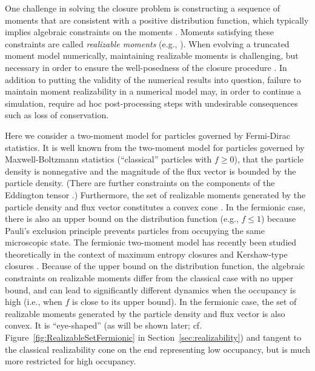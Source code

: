 One challenge in solving the closure problem is constructing a sequence of moments that are consistent with a positive distribution function, which typically implies algebraic constraints on the moments \cite{kershaw_1976,levermore_1984}.  
Moments satisfying these constraints are called \emph{realizable moments} (e.g., \cite{levermore_1996}).  
When evolving a truncated moment model numerically, maintaining realizable moments is challenging, but necessary in order to ensure the well-posedness of the closure procedure \cite{levermore_1996,junk_1998,hauck_2008}.  
In addition to putting the validity of the numerical results into question, failure to maintain moment realizability in a numerical model may, in order to continue a simulation, require ad hoc post-processing steps with undesirable consequences such as loss of conservation.  

Here we consider a two-moment model for particles governed by Fermi-Dirac statistics.  
It is well known from the two-moment model for particles governed by Maxwell-Boltzmann statistics (``classical'' particles with $f\ge0$), that the particle density is nonnegative and the magnitude of the flux vector is bounded by the particle density.  
(There are further constraints on the components of the Eddington tensor \cite{levermore_1984}.)  
Furthermore, the set of realizable moments generated by the particle density and flux vector constitutes a convex cone \cite{olbrant_etal_2012}.  
In the fermionic case, there is also an upper bound on the distribution function (e.g., $f\le1$) because Pauli's exclusion principle prevents particles from occupying the same microscopic state.  
The fermionic two-moment model has recently been studied theoretically in the context of maximum entropy closures \cite{lareckiBanach_2011,banachLarecki_2013,banachLarecki_2017b} and Kershaw-type closures \cite{banachLarecki_2017a}.  
Because of the upper bound on the distribution function, the algebraic constraints on realizable moments differ from the classical case with no upper bound, and can lead to significantly different dynamics when the occupancy is high (i.e., when $f$ is close to its upper bound).  
In the fermionic case, the set of realizable moments generated by the particle density and flux vector is also convex. 
It is ``eye-shaped'' (as will be shown later; cf. Figure~\ref{fig:RealizableSetFermionic} in Section~\ref{sec:realizability}) and tangent to the classical realizability cone on the end representing low occupancy, but is much more restricted for high occupancy.  

